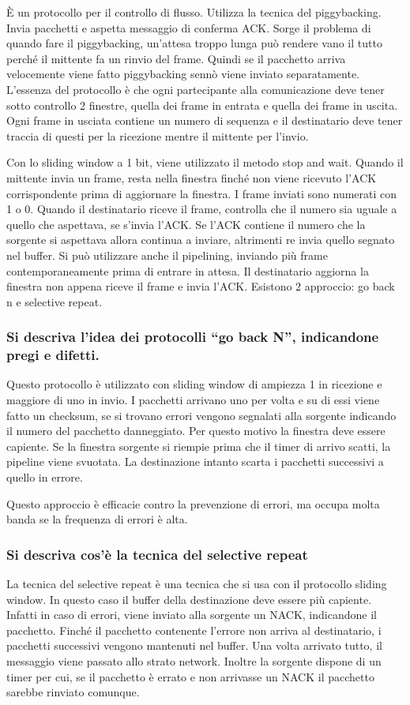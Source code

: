 È un protocollo per il controllo di flusso. Utilizza la tecnica del piggybacking. Invia pacchetti e
aspetta messaggio di conferma ACK. Sorge il problema di quando fare il piggybacking, un’attesa
troppo lunga può rendere vano il tutto perché il mittente fa un rinvio del frame. Quindi se il
pacchetto arriva velocemente viene fatto piggybacking sennò viene inviato separatamente.
L’essenza del protocollo è che ogni partecipante alla comunicazione deve tener sotto controllo 2
finestre, quella dei frame in entrata e quella dei frame in uscita. Ogni frame in usciata contiene un numero di sequenza e il destinatario deve tener traccia di questi per la ricezione mentre il mittente per l’invio.

Con lo sliding window a 1 bit, viene utilizzato il metodo stop and wait. Quando il mittente invia un
frame, resta nella finestra finché non viene ricevuto l’ACK corrispondente prima di aggiornare la
finestra. I frame inviati sono numerati con 1 o 0. Quando il destinatario riceve il frame, controlla
che il numero sia uguale a quello che aspettava, se s’invia l’ACK. Se l’ACK contiene il numero che la sorgente si aspettava allora continua a inviare, altrimenti re invia quello segnato nel buffer. Si può utilizzare anche il pipelining, inviando più frame contemporaneamente prima di entrare in attesa. Il destinatario aggiorna la finestra non appena riceve il frame e invia l’ACK. Esistono 2 approccio: go back n e selective repeat.

\subsubsection{Si descriva l'idea dei protocolli ``go back N'', indicandone pregi e difetti.}

Questo protocollo è utilizzato con sliding window di ampiezza 1 in ricezione e maggiore di uno in
invio. I pacchetti arrivano uno per volta e su di essi viene fatto un checksum, se si trovano errori
vengono segnalati alla sorgente indicando il numero del pacchetto danneggiato. Per questo motivo la finestra deve essere capiente. Se la finestra sorgente si riempie prima che il timer di arrivo scatti, la pipeline viene svuotata. La destinazione intanto scarta i pacchetti successivi a quello in errore.

Questo approccio è efficacie contro la prevenzione di errori, ma occupa molta banda se la frequenza di errori è alta.

\subsubsection{Si descriva cos'è la tecnica del selective repeat}

La tecnica del selective repeat è una tecnica che si usa con il protocollo sliding window. In questo caso il buffer della destinazione deve essere più capiente. Infatti in caso di errori, viene inviato alla sorgente un NACK, indicandone il pacchetto. Finché il pacchetto contenente l'errore non arriva al destinatario, i pacchetti successivi vengono mantenuti nel buffer. Una volta arrivato tutto, il messaggio viene passato allo strato network. Inoltre la sorgente dispone di un timer per cui, se il pacchetto è errato e non arrivasse un NACK il pacchetto sarebbe rinviato comunque.
